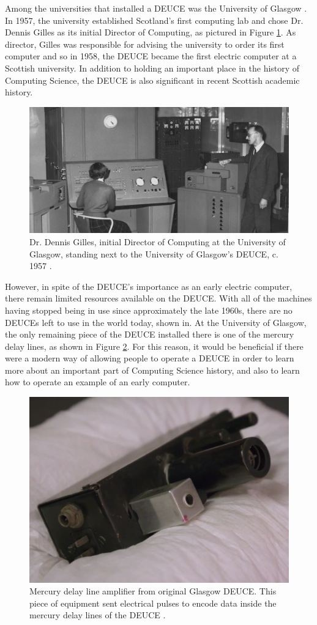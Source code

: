\documentclass{l4proj}
\begin{document}
Among the universities that installed a DEUCE was the University of Glasgow \citep{Glasgow60}. In 1957, the university established Scotland's first computing lab and chose Dr. Dennis Gilles as its initial Director of Computing, as pictured in Figure \ref{fig:gilles}. As director, Gilles was responsible for advising the university to order its first computer and so in 1958, the DEUCE became the first electric computer at a Scottish university. In addition to holding an important place in the history of Computing Science, the DEUCE is also significant in recent Scottish academic history.

\begin{figure}[b]
	\centering
	\includegraphics[width=0.7\linewidth]{images/gilles}
	\caption{Dr. Dennis Gilles, initial Director of Computing at the University of Glasgow, standing next to the University of Glasgow's DEUCE, c. 1957 \citep{DelayLine19}.}
	\label{fig:gilles}
\end{figure}

However, in spite of the DEUCE's importance as an early electric computer, there remain limited resources available on the DEUCE. With all of the machines having stopped being in use since approximately the late 1960s, there are no DEUCEs left to use in the world today, shown in. At the University of Glasgow, the only remaining piece of the DEUCE installed there is one of the mercury delay lines, as shown in Figure \ref{fig:amp}. For this reason, it would be beneficial if there were a modern way of allowing people to operate a DEUCE in order to learn more about an important part of Computing Science history, and also to learn how to operate an example of an early computer.

\begin{figure}[h!]
	\centering
	\includegraphics[width=0.7\linewidth]{images/delay-line-amplifier}
	\caption{Mercury delay line amplifier from original Glasgow DEUCE. This piece of equipment sent electrical pulses to encode data inside the mercury delay lines of the DEUCE \citep{DelayLine19}.}
	\label{fig:amp}
\end{figure}
\end{document}
